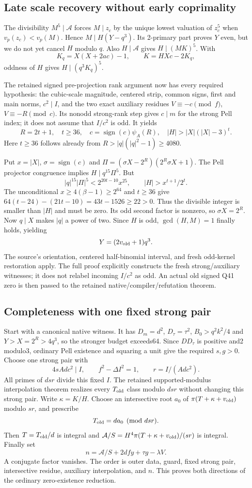 \subsection{Late scale recovery without early coprimality}
The divisibility $M^5\mid\mathcal A$ forces $M\mid z_c$ by the
unique lowest valuation of $z_c^5$ when $v_p(z_c)<v_p(M)$.
Hence $M\mid H(Y-q^3)$. Its 2-primary part proves $Y$ even, but
we do not yet cancel $H$ modulo $q$.
Also $H\mid\mathcal A$ gives $H\mid(MK)^5$. With
\[
 K_q=X(X+2ac)-1,\qquad K=HXc-2K_q,
\]
oddness of $H$ gives $H\mid(q^3K_q)^5$.

The retained signed pre-projection rank argument now has every required
hypothesis: the cubic-scale magnitude, centered strip, common signs,
first and main norms, $c^2\mid I$, and the two exact auxiliary residues
$V\equiv-c\pmod f$, $V\equiv-R\pmod c$.
Its nonodd strong-rank step gives $c\mid m$ for the strong Pell index;
it does not assume that $I/c^2$ is odd. It yields
\[
 R=2t+1,\quad t\ge36,\quad
 c=\operatorname{sign}(c)\psi_A(R),\quad
 |H|>|X|(|X|-3)^t.
\]
Here $t\ge36$ follows already from
$R>|q|(|q|^2-1)\ge4080$.

Put $x=|X|$, $\sigma=\operatorname{sign}(c)$ and
$\Pi=(\sigma X-2^R)(2^R\sigma X+1)$.
The Pell projector congruence implies $H\mid q^{15}\Pi^5$.
But
\[
 |q|^{15}|\Pi|^5<2^{20t-10}x^{25},\qquad
 |H|>x^{t+1}/2^t.
\]
The unconditional $x\ge4(\beta-1)\ge2^{64}$ and $t\ge36$ give
$64(t-24)-(21t-10)=43t-1526\ge22>0$.
Thus the divisible integer is smaller than $|H|$ and must be zero.
Its odd second factor is nonzero, so $\sigma X=2^R$.
Now $q\mid X$ makes $|q|$ a power of two. Since $H$ is odd,
$\gcd(H,M)=1$ finally holds, yielding
\[
 Y=(2v_{\rm old}+1)q^3.
\]
The source's orientation, centered half-binomial interval, and fresh
odd-kernel restoration apply. The full proof explicitly constructs the
fresh strong/auxiliary witnesses; it does not relabel incoming $I/c^2$
as odd. An actual old signed Q41 zero is then passed to the retained
native/compiler/refutation theorem.

\subsection{Completeness with one fixed strong pair}
Start with a canonical native witness. It has $D_m=d^2$, $D_\tau=\tau^2$,
$B_0>q^2k^2/4$ and $Y>X=2^R>4q^3$, so the stronger budget exceeds64.
Since $D D_\tau$ is positive and2 modulo3, ordinary Pell existence and
squaring a unit give the required $s,g>0$.
Choose one strong pair with
\[
 4sAdc^2\mid I,\qquad f^2-\Delta I^2=1,
 \qquad r=I/(Adc^2).
\]
All primes of $dsr$ divide this fixed $I$.
The retained supported-modulus interpolation theorem realizes every
$T_{\rm old}$ class modulo $dsr$ without changing this strong pair.
Write $\kappa=K/H$. Choose an intersective root $a_0$ of
$\pi(T+\kappa+v_{\rm old})$ modulo $sr$, and prescribe
\[
 T_{\rm old}=da_0\pmod{dsr}.
\]
Then $T=T_{\rm old}/d$ is integral and
$\mathcal A/S=H^4\pi(T+\kappa+v_{\rm old})/(sr)$ is integral.
Finally set
\[
 n=\mathcal A/S+2dfy+\tau g-\lambda V.
\]
A conjugate factor vanishes. The order is outer data, guard, fixed strong
pair, intersective residue, auxiliary interpolation, and $n$.
This proves both directions of the ordinary zero-existence reduction.

